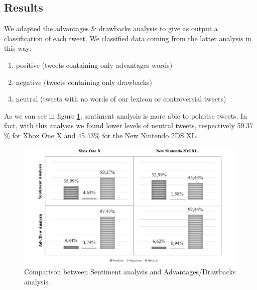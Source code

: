 \documentclass[b5paper,]{book}
\providecommand{\tightlist}{%
  \setlength{\itemsep}{0pt}\setlength{\parskip}{0pt}}
\theoremstyle{definition}
\theoremstyle{definition}
\theoremstyle{definition}
\theoremstyle{remark}
\begin{document}
\subsection{Results}\label{results-9}

We adapted the advantages \& drawbacks analysis to give as output a
classification of each tweet. We classified data coming from the latter
analysis in this way:

\begin{enumerate}
\def\labelenumi{\arabic{enumi}.}
\tightlist
\item
  positive (tweets containing only advantages words)
\item
  negative (tweets containing only drawbacks)
\item
  neutral (tweets with no words of our lexicon or controversial tweets)
\end{enumerate}

As we can see in figure \ref{fig:tweetsentres}, sentiment analysis is
more able to polarise tweets. In fact, with this analysis we found lower
levels of neutral tweets, respectively 59.37 \% for Xbox One X and
45.43\% for the New Nintendo 2DS XL.

\begin{figure}

{\centering \includegraphics[width=1\linewidth]{_bookdown_files/figures/tweet_sent_res} 

}

\caption{Comparison between Sentiment analysis and Advantages/Drawbacks analysis.}\label{fig:tweetsentres}
\end{figure}
\end{document}
